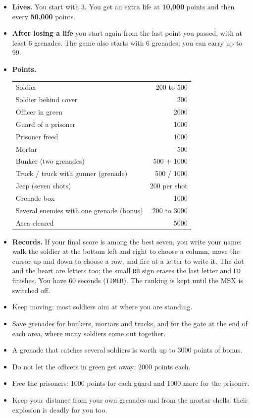 \begin{itemize}
\item \textbf{Lives.} You start with 3. You get an extra life at \textbf{10,000} points and then every \textbf{50,000} points.
\item \textbf{After losing a life} you start again from the last point you passed, with at least 6 grenades. The game also
starts with 6 grenades; you can carry up to 99.
\item \begin{minipage}[t]{\linewidth}\textbf{Points.}
\begin{center}
\begin{tabular}{@{}lr@{}}
\toprule
Soldier & 200 to 500\\
Soldier behind cover & 200\\
Officer in green & 2000\\
Guard of a prisoner & 1000\\
Prisoner freed & 1000\\
Mortar & 500\\
Bunker (two grenades) & 500 + 1000\\
Truck / truck with gunner (grenade) & 500 / 1000\\
Jeep (seven shots) & 200 per shot\\
Grenade box & 1000\\
Several enemies with one grenade (bonus) & 200 to 3000\\
Area cleared & 5000\\
\bottomrule
\end{tabular}
\end{center}\end{minipage}
\item \textbf{Records.} If your final score is among the best seven, you write your name: walk the soldier at the bottom
left and right to choose a column, move the cursor up and down to choose a row, and fire at a letter to write it. The dot and the
heart are letters too; the small \texttt{RB} sign erases the last letter and \texttt{ED} finishes. You have 60 seconds (\texttt{TIMER}).
The ranking is kept until the MSX is switched off.
\end{itemize}


\begin{itemize}
\item Keep moving: most soldiers aim at where you are standing.
\item Save grenades for bunkers, mortars and trucks, and for the gate at the end of each area, where many soldiers come out
together.
\item A grenade that catches several soldiers is worth up to 3000 points of bonus.
\item Do not let the officers in green get away: 2000 points each.
\item Free the prisoners: 1000 points for each guard and 1000 more for the prisoner.
\item Keep your distance from your own grenades and from the mortar shells: their explosion is deadly for you too.
\end{itemize}
